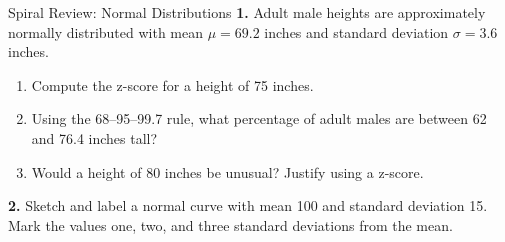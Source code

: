\documentclass[10pt]{article}
\begin{document}
\namedateperiod

\vspace{0.15in}

\begin{notesbox}{Spiral Review: Normal Distributions}
\textbf{1.} Adult male heights are approximately normally distributed with mean
$\mu = 69.2$ inches and standard deviation $\sigma = 3.6$ inches.

\begin{enumerate}[label=\alph*.]
  \item Compute the z-score for a height of 75 inches. \blank{5cm}
  \item Using the 68--95--99.7 rule, what percentage of adult males are between
        62 and 76.4 inches tall? \blank{5cm}
  \item Would a height of 80 inches be unusual? Justify using a z-score.
\end{enumerate}

\vspace{0.1in}
\textbf{2.} Sketch and label a normal curve with mean 100 and standard deviation 15.
Mark the values one, two, and three standard deviations from the mean.

\vspace{1.4in}
\end{notesbox}
\end{document}

